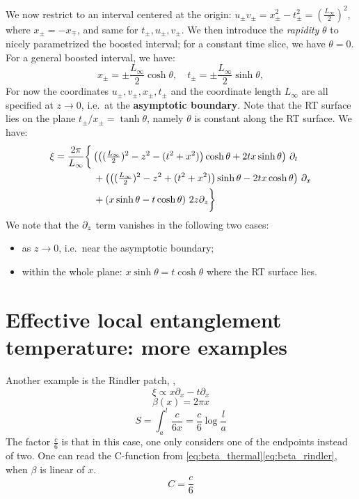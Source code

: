 \documentclass[11pt,a4paper,utf8]{article}
\begin{document}
	We now restrict to an interval centered at the origin: $
		u_\pm v_\pm
		= x^2_\pm - t^2_\pm
		= (\frac{L_\infty}{2})^2
	$, where $x_\pm = -x_\mp$, and same for $t_\pm, u_\pm, v_\pm$. 
	We then introduce the \textit{rapidity} $\theta$ to nicely parametrized the boosted interval; for a constant time slice, we have $\theta = 0$. For a general boosted interval, we have:
	\begin{equation}
		x_\pm = \pm \frac{L_\infty}{2} \cosh \theta,
	\quad
		t_\pm = \pm \frac{L_\infty}{2} \sinh \theta,
	\end{equation}
	For now the coordinates $u_\pm, v_\pm, x_\pm, t_\pm$ and the coordinate length $L_\infty$ are all specified at $z\to 0$, i.e.~at the \textbf{asymptotic boundary}. Note that the RT surface lies on the plane $
		t_\pm / x_\pm = \tanh \theta
	$, namely $\theta$ is constant along the RT surface. 
	We have:
	\begin{gather}
	\begin{aligned}
		\xi &= \frac{2\pi}{L_\infty} \bigg\{
			\left(
				\left(
					(\tfrac{L_\infty}{2})^2 - z^2
					- (t^2 + x^2)
				\right) \cosh\theta
				+ 2tx \sinh\theta
			\right) \,\partial_{t}
		\\ &\qquad\qquad 
			+ \left(
				\left(
					(\tfrac{L_\infty}{2})^2 - z^2
					+ (t^2 + x^2)
				\right) \sinh\theta
				- 2tx \cosh\theta
			\right) \,\partial_{x}
		\\ &\qquad\qquad 
			+ \left(
				x\sinh\theta
				- t\cosh\theta
			\right) \,2z\partial_{z}
		\bigg\}
	\end{aligned}
	\end{gather}
	We note that the $\partial_{z}$ term vanishes in the following two cases:
	\begin{itemize}[noitemsep,topsep=0pt]
	\item as $z\to 0$, i.e.~near the asymptotic boundary;
	\item within the whole plane: $
			x\sinh\theta
			= t\cosh\theta
		$ where the RT surface lies. 
	\end{itemize}

\section{Effective local entanglement temperature: more examples}
	
	Another example is the Rindler patch, ,
	\begin{equation}
	\xi\propto x\partial_x-t\partial_x
	\end{equation}
	\begin{equation}
	\beta(x)=2\pi x
	\label{eq:beta_rindler}
	\end{equation}
	\begin{equation}
	S=\int_{a}^{l}\frac{c}{6x}=\frac{c}{6}\log \frac{l}{a}
	\end{equation}
	The factor $\frac{c}{6}$ is that in this case, one only considers one of the endpoints instead of two. One can read the C-function from \eqref{eq:beta_thermal}\eqref{eq:beta_rindler}, when $\beta$ is linear of $x$.
	\begin{equation}
	C=\frac{c}{6}
	\end{equation}
	
\end{document}

